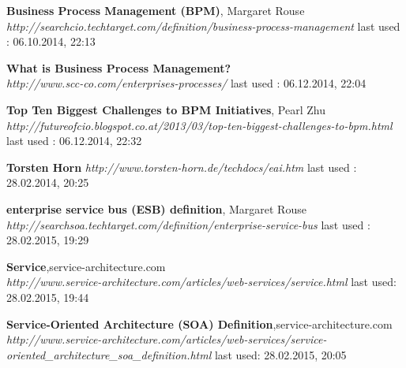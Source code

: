 \documentclass[12pt]{article}
\begin{document}
\begin{thebibliography}{56}
   \textbf{Business Process Management (BPM)}, Margaret Rouse\\
  \textit{http://searchcio.techtarget.com/definition/business-process-management}
  \newline last used : 06.10.2014, 22:13
 
 
   \textbf{What is Business Process Management? }\\
  \textit{http://www.scc-co.com/enterprises-processes/}
  \newline last used : 06.12.2014, 22:04


   \textbf{Top Ten Biggest Challenges to BPM Initiatives}, Pearl Zhu\\
  \textit{http://futureofcio.blogspot.co.at/2013/03/top-ten-biggest-challenges-to-bpm.html}
  \newline last used : 06.12.2014, 22:32
   
   
   

   \textbf{Torsten Horn}\newline
  \textit{http://www.torsten-horn.de/techdocs/eai.htm}
  \newline last used : 28.02.2014, 20:25




   	     	  
   \textbf{enterprise service bus (ESB) definition}, Margaret Rouse\\
  \textit{ http://searchsoa.techtarget.com/definition/enterprise-service-bus}
  \newline last used : 28.02.2015, 19:29 	 
   	     	     	     	  





 
   \textbf{Service},service-architecture.com \\
  \textit{http://www.service-architecture.com/articles/web-services/service.html}
  \newline last used: 28.02.2015, 19:44
     
   \textbf{Service-Oriented Architecture (SOA) Definition},service-architecture.com \\
  \textit{http://www.service-architecture.com/articles/web-services/service-oriented\_architecture\_soa\_definition.html}
  \newline last used: 28.02.2015, 20:05
     

\end{thebibliography}
\end{document}

